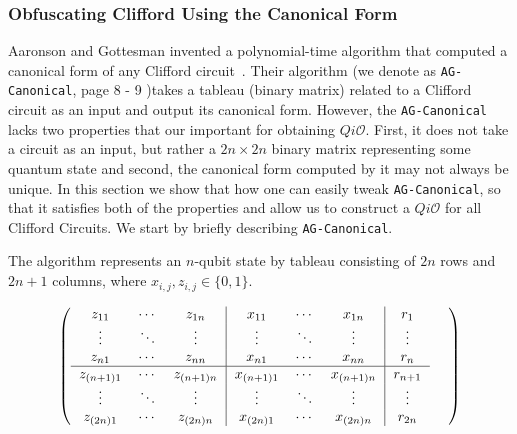 \subsubsection{Obfuscating Clifford Using the Canonical Form}
\label{sec:Clifford-iO-canonical}


Aaronson and Gottesman invented a polynomial-time algorithm that computed a canonical form of any Clifford circuit~\cite{AG04}. Their algorithm (we denote as {\tt AG-Canonical}, page 8 - 9 \cite{AG04})takes a tableau (binary matrix) related to a Clifford circuit as an input and output its canonical form.  However, the {\tt AG-Canonical} lacks two properties that our important for obtaining $Qi\mathcal{O}.$ First, it does not take a circuit as an input, but rather a $2n \times 2n$ binary matrix representing some quantum state and second, the canonical form computed by it may not always be unique. In this section we show that how one can easily tweak {\tt AG-Canonical}, so that it satisfies both of the properties and allow us to construct a  $Qi\mathcal{O}$ for all Clifford Circuits. We start by briefly describing  {\tt AG-Canonical}.


The algorithm  represents an $n$-qubit state by tableau consisting of $2n$ rows and $2n+1$ columns, where $x_{i,j} ,z_{i,j}\in \{0,1\}.$


\[
\left(
\begin{tabular}
[c]{ccc|ccc|c}%
$z_{11}$ & $\cdots$ & $z_{1n}$ & $x_{11}$ & $\cdots$ & $x_{1n}$ & $r_{1}$\\
$\vdots$ & $\ddots$ & $\vdots$ & $\vdots$ & $\ddots$ & $\vdots$ & $\vdots$\\
$z_{n1}$ & $\cdots$ & $z_{nn}$ & $x_{n1}$ & $\cdots$ & $x_{nn}$ & $r_{n}%
$\\\hline
$z_{\left(  n+1\right)  1}$ & $\cdots$ & $z_{\left(  n+1\right)  n}$ &
$x_{\left(  n+1\right)  1}$ & $\cdots$ & $x_{\left(  n+1\right)  n}$ &
$r_{n+1}$\\
$\vdots$ & $\ddots$ & $\vdots$ & $\vdots$ & $\ddots$ & $\vdots$ & $\vdots$\\
$z_{\left(  2n\right)  1}$ & $\cdots$ & $z_{\left(  2n\right)  n}$ &
$x_{\left(  2n\right)  1}$ & $\cdots$ & $x_{\left(  2n\right)  n}$ & $r_{2n}$%
\end{tabular}
\ \ \ \ \right)
\]

